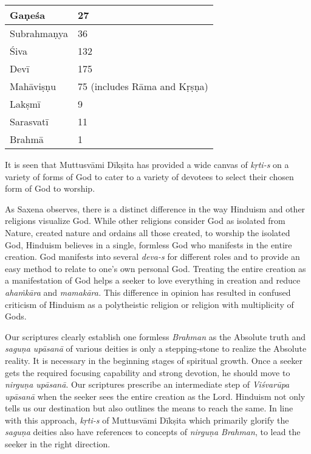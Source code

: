 \begin{longtable}{|l|l|}
\hline
Gaṇeśa & 27 \\
\hline
Subrahmaṇya & 36 \\
\hline
Śiva & 132 \\
\hline
Devī & 175 \\
\hline
Mahāviṣṇu & 75 (includes Rāma and Kṛṣṇa) \\
\hline
Lakṣmī & 9 \\
\hline
Sarasvatī & 11 \\
\hline
Brahmā & 1 \\
\hline
\end{longtable}

It is seen that Muttusvāmi Dīkṣita has provided a wide canvas of \textit{kṛti-s} on a variety of forms of God to cater to a variety of devotees to select their chosen form of God to worship.

As Saxena observes, there is a distinct difference in the way Hinduism and other religions visualize God. While other religions consider God as isolated from Nature, created nature and ordains all those created, to worship the isolated God, Hinduism believes in a single, formless God who manifests in the entire creation. God manifests into several \textit{deva-s} for different roles and to provide an easy method to relate to one’s own personal God. Treating the entire creation as a manifestation of God helps a seeker to love everything in creation and reduce \textit{ahaṁkāra} and \textit{mamakāra.} This difference in opinion has resulted in confused criticism of Hinduism as a polytheistic religion or religion with multiplicity of Gods.

Our scriptures clearly establish one formless \textit{Brahman} as the Absolute truth and \textit{saguṇa upāsanā} of various deities is only a stepping-stone to realize the Absolute reality. It is necessary in the beginning stages of spiritual growth. Once a seeker gets the required focusing capability and strong devotion, he should move to \textit{nirguṇa upāsanā}. Our scriptures prescribe an intermediate step of \textit{Viśvarūpa upāsanā} when the seeker sees the entire creation as the Lord. Hinduism not only tells us our destination but also outlines the means to reach the same. In line with this approach, \textit{kṛti-s} of Muttusvāmi Dīkṣita which primarily glorify the \textit{saguṇa} deities also have references to concepts of \textit{nirguṇa Brahman}, to lead the seeker in the right direction.

